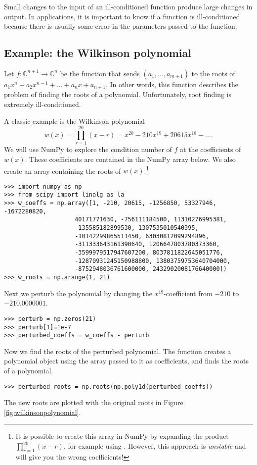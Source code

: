 Small changes to the input of an ill-conditioned function produce large changes in output.
In applications, it is important to know if a function is ill-conditioned because there is usually some error in the parameters passed to the function.

\subsection*{Example: the Wilkinson polynomial}
Let $f:\mathbb{C}^{n+1} \rightarrow \mathbb{C}^n$ be the function that sends $(a_1, \ldots, a_{m+1})$ to the roots of $a_1x^n+a_2x^{n-1}+\ldots+a_nx+a_{n+1}$.
In other words, this function describes the problem of finding the roots of a polynomial.
Unfortunately, root finding is extremely ill-conditioned.

A classic example is the Wilkinson polynomial
\[
w(x) = \prod_{r=1}^{20}(x-r) = x^{20}-210x^{19}+20615x^{18}-\ldots.
\]
We will use NumPy to explore the condition number of $f$ at the coefficients of $w(x)$.
These coefficients are contained in the NumPy array  below.
We also create an array  containing the roots of $w(x)$.\footnote{
It is possible to create this array in NumPy by expanding the product $\prod_{r=1}^{20}(x-r)$, for example using .
However, this approach is \emph{unstable} and will give you the wrong coefficients!}
\begin{lstlisting}
>>> import numpy as np
>>> from scipy import linalg as la
>>> w_coeffs = np.array([1, -210, 20615, -1256850, 53327946, -1672280820,
                    40171771630, -756111184500, 11310276995381,
                    -135585182899530, 1307535010540395,
                    -10142299865511450, 63030812099294896,
                    -311333643161390640, 1206647803780373360,
                    -3599979517947607200, 8037811822645051776,
                    -12870931245150988800, 13803759753640704000,
                    -8752948036761600000, 2432902008176640000])
>>> w_roots = np.arange(1, 21)
\end{lstlisting}

Next we perturb the polynomial by changing the $x^{19}$-coefficient from $-210$ to $-210.0000001$.
\begin{lstlisting}
>>> perturb = np.zeros(21)
>>> perturb[1]=1e-7
>>> perturbed_coeffs = w_coeffs - perturb
\end{lstlisting}

Now we find the roots of the perturbed polynomial.
The function  creates a polynomial object using the array passed to it as coefficients, and  finds the roots of a polynomial.
\begin{lstlisting}
>>> perturbed_roots = np.roots(np.poly1d(perturbed_coeffs))
\end{lstlisting}
The new roots are plotted with the original roots in Figure \ref{fig:wilkinsonpolynomial}.

